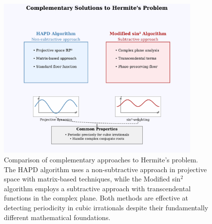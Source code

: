 
\begin{figure}[ht]
\centering
\includegraphics[width=0.9\textwidth]{../figures/output/complementary_solutions_diagram.pdf}

\caption{Comparison of complementary approaches to Hermite's problem. The HAPD algorithm uses a non-subtractive approach in projective space with matrix-based techniques, while the Modified sin$^2$ algorithm employs a subtractive approach with transcendental functions in the complex plane. Both methods are effective at detecting periodicity in cubic irrationals despite their fundamentally different mathematical foundations.}
\label{fig:complementary_approaches}
\end{figure}


